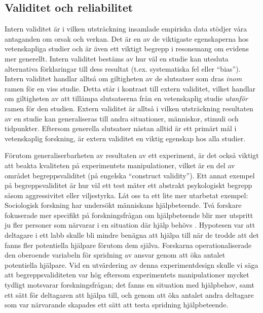 \documentclass[
]{book}
\begin{document}
\hypertarget{sub07.1.1}{%
\subsection{Validitet och reliabilitet}\label{sub07.1.1}}

Intern validitet är i vilken utsträckning insamlade empiriska data stödjer våra antaganden om orsak och verkan. Det är en av de viktigaste egenskaperna hos vetenskapliga studier och är även ett viktigt begrepp i resonemang om evidens mer generellt. Intern validitet bestäms av hur väl en studie kan utesluta alternativa förklaringar till dess resultat (t.ex. systematiska fel eller ``bias''). Intern validitet handlar alltså om giltigheten av de slutsatser som dras \emph{inom} ramen för en viss studie. Detta står i kontrast till extern validitet, vilket handlar om giltigheten av att tillämpa slutsatserna från en vetenskaplig studie \emph{utanför} ramen för den studien. Extern validitet är alltså i vilken utsträckning resultaten av en studie kan generaliseras till andra situationer, människor, stimuli och tidpunkter. Eftersom generella slutsatser nästan alltid är ett primärt mål i vetenskaplig forskning, är extern validitet en viktig egenskap hos alla studier.

Förutom generaliserbarheten av resultaten av ett experiment, är det också viktigt att beakta kvaliteten på experimentets manipulationer, vilket är en del av området begreppsvaliditet (på engelska ``construct validity''). Ett annat exempel på begreppsvaliditet är hur väl ett test mäter ett abstrakt psykologiskt begrepp såsom aggressivitet eller viljestyrka. Låt oss ta ett lite mer utarbetat exempel: Sociologisk forskning har undersökt människans hjälpbeteende. Två forskare fokuserade mer specifikt på forskningsfrågan om hjälpbeteende blir mer utspritt ju fler personer som närvarar i en situation där hjälp behövs \citep{darley1968bystander}. Hypotesen var att deltagare i ett labb skulle bli mindre benägna att hjälpa till när de trodde att det fanns fler potentiella hjälpare förutom dem själva. Forskarna operationaliserade den oberoende variabeln för spridning av ansvar genom att öka antalet potentiella hjälpare. Vid en utvärdering av denna experimentdesign skulle vi säga att begreppsvaliditeten var hög eftersom experimentets manipulationer mycket tydligt motsvarar forskningsfrågan; det fanns en situation med hjälpbehov, samt ett sätt för deltagaren att hjälpa till, och genom att öka antalet andra deltagare som var närvarande skapades ett sätt att testa spridning hjälpbeteende.
\end{document}
